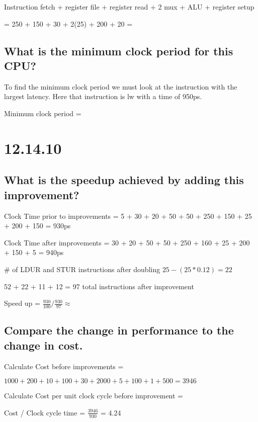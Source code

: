 \documentclass{article}
\begin{document}
Instruction fetch + register file + register read + 2 mux + ALU + register setup

= 250 + 150 + 30 + 2(25) + 200 + 20 = 

\subsection{What is the minimum clock period for this CPU?}

To find the minimum clock period we must look at the instruction with the largest latency. Here that instruction is lw with a time of 950ps.

Minimum clock period = 

\section{12.14.10}

\subsection{What is the speedup achieved by adding this improvement?}

Clock Time prior to improvements = 5 + 30 + 20 + 50 + 50 + 250 + 150 + 25 + 200 + 150 = 930ps

Clock Time after improvements =  30 + 20 + 50 + 50 + 250 + 160 + 25 + 200 + 150 + 5 = 940ps

\# of LDUR and STUR instructions after doubling $25 - (25 * 0.12) = 22$

52 + 22 + 11 + 12 = 97 total instructions after improvement

Speed up = $\frac{930}{100} / \frac{930}{97} \approx$ 

\subsection{Compare the change in performance to the change in
cost.}

Calculate Cost before improvements = 

\begin{center}
    $1000 + 200 + 10 + 100 + 30 + 2000 + 5 + 100 + 1 + 500 = 3946$
\end{center}

Calculate Cost per unit clock cycle before improvement = 

\begin{center}
Cost / Clock cycle time =  $\frac{3946}{930}$ = 4.24\
\end{center}
\end{document}
